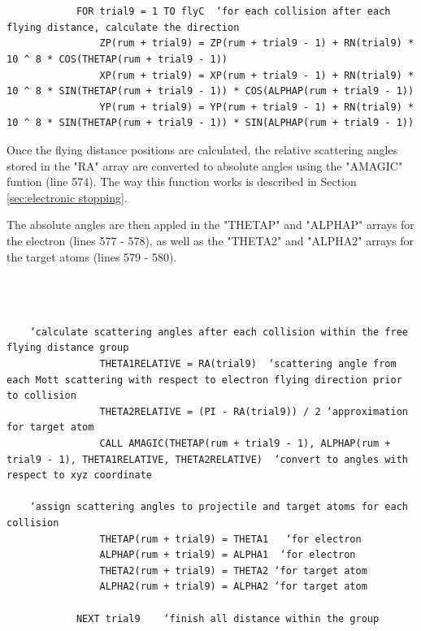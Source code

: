 \documentclass[10pt, reqno]{exam}
\begin{document}
\begin{verbatim}
    
    
            FOR trial9 = 1 TO flyC  ‘for each collision after each flying distance, calculate the direction 
                ZP(rum + trial9) = ZP(rum + trial9 - 1) + RN(trial9) * 10 ^ 8 * COS(THETAP(rum + trial9 - 1))
                XP(rum + trial9) = XP(rum + trial9 - 1) + RN(trial9) * 10 ^ 8 * SIN(THETAP(rum + trial9 - 1)) * COS(ALPHAP(rum + trial9 - 1))
                YP(rum + trial9) = YP(rum + trial9 - 1) + RN(trial9) * 10 ^ 8 * SIN(THETAP(rum + trial9 - 1)) * SIN(ALPHAP(rum + trial9 - 1))
\end{verbatim}

Once the flying distance positions are calculated, the relative scattering angles stored in the "RA" array are converted to absolute angles using the "AMAGIC" funtion (line 574). The way this function works is described in Section \ref{sec:electronic stopping}. \par

The absolute angles are then appled in the "THETAP" and "ALPHAP" arrays for the electron (lines 577 - 578), as well as the "THETA2" and "ALPHA2" arrays for the target atoms (lines 579 - 580). \par

\begin{verbatim}
    
    
    
    ‘calculate scattering angles after each collision within the free flying distance group
                THETA1RELATIVE = RA(trial9)  ‘scattering angle from each Mott scattering with respect to electron flying direction prior to collision 
                THETA2RELATIVE = (PI - RA(trial9)) / 2 ‘approximation for target atom
                CALL AMAGIC(THETAP(rum + trial9 - 1), ALPHAP(rum + trial9 - 1), THETA1RELATIVE, THETA2RELATIVE)  ‘convert to angles with respect to xyz coordinate
    
    ‘assign scattering angles to projectile and target atoms for each collision
                THETAP(rum + trial9) = THETA1   ‘for electron
                ALPHAP(rum + trial9) = ALPHA1  ‘for electron
                THETA2(rum + trial9) = THETA2 ‘for target atom
                ALPHA2(rum + trial9) = ALPHA2 ‘for target atom
    
            NEXT trial9    ‘finish all distance within the group
\end{verbatim}
\end{document}
